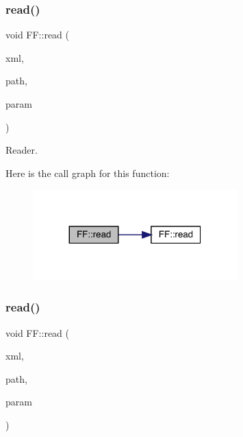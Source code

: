 \subsubsection{\texorpdfstring{read()}{read()}\hspace{0.1cm}{\footnotesize\ttfamily [4/15]}}
{\footnotesize\ttfamily void F\+F\+::read (\begin{DoxyParamCaption}\item[{X\+M\+L\+Reader \&}]{xml,  }\item[{const std\+::string \&}]{path,  }\item[{\mbox{\hyperlink{structFF_1_1PiPf}{Pi\+Pf}} \&}]{param }\end{DoxyParamCaption})}



Reader. 

Here is the call graph for this function\+:\nopagebreak
\begin{figure}[H]
\begin{center}
\leavevmode
\includegraphics[width=224pt]{d5/da6/namespaceFF_ab0ac23f91d1403059f1df825a7ab775f_cgraph}
\end{center}
\end{figure}
\mbox{\label{namespaceFF_a457d1bd921b678eadc34fb2dbfcbdb32}} 
\subsubsection{\texorpdfstring{read()}{read()}\hspace{0.1cm}{\footnotesize\ttfamily [5/15]}}
{\footnotesize\ttfamily void F\+F\+::read (\begin{DoxyParamCaption}\item[{X\+M\+L\+Reader \&}]{xml,  }\item[{const std\+::string \&}]{path,  }\item[{\mbox{\hyperlink{structFF_1_1KeyHadron3PtCorr__t}{Key\+Hadron3\+Pt\+Corr\+\_\+t}} \&}]{param }\end{DoxyParamCaption})}



